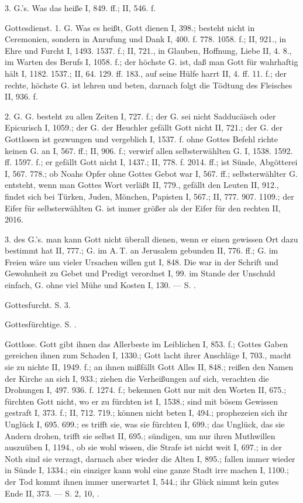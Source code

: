 3.  G.’s. Was das heiße I, 849. ff.; II, 546. f.

Gottesdienst. 1.  G. Was es heißt, Gott dienen I, 398.; besteht nicht in Ceremonien, sondern in Anrufung und Dank I, 400. f. 778. 1058. f.; II, 921., in Ehre und Furcht I, 1493. 1537. f.; II, 721., in Glauben, Hoffnung, Liebe II, 4. 8., im Warten des Berufs I, 1058. f.; der höchste G. ist, daß man Gott für wahrhaftig hält I, 1182. 1537.; II, 64. 129. ff. 183., auf seine Hülfe harrt II, 4. ff. 11. f.; der rechte, höchste G. ist lehren und beten, darnach folgt die Tödtung des Fleisches II, 936. f.

2.  G.  G. besteht zu allen Zeiten I, 727. f.; der G. sei nicht Sadducäisch oder Epicurisch I, 1059.; der G. der Heuchler gefällt Gott nicht II, 721.; der G. der Gottlosen ist gezwungen und vergeblich I, 1537. f.  ohne Gottes Befehl richte keinen G. an I, 567. ff.; II, 906. f.; verwirf allen selbsterwählten G. I, 1538. 1592. ff. 1597. f.; er gefällt Gott nicht I, 1437.; II, 778. f. 2014. ff.; ist Sünde, Abgötterei I, 567. 778.; ob Noahs Opfer ohne Gottes Gebot war I, 567. ff.; selbsterwählter G. entsteht, wenn man Gottes Wort verläßt II, 779., gefällt den Leuten II, 912., findet sich bei Türken, Juden, Mönchen, Papisten I, 567.; II, 777. 907. 1109.; der Eifer für selbsterwählten G. ist immer größer als der Eifer für den rechten II, 2016.

3.  des G.’s.  man kann Gott nicht überall dienen, wenn er einen gewissen Ort dazu bestimmt hat II, 777.; G. im A.\,T. an Jerusalem gebunden II, 776. ff.; G. im Freien wäre um vieler Ursachen willen gut I, 848. Die  war in der Schrift und Gewohnheit zu Gebet und Predigt verordnet I, 99.  im Stande der Unschuld einfach, G. ohne viel Mühe und Kosten I, 130. — S. .

Gottesfurcht. S.  3.

Gottesfürchtige. S. .

Gottlose. Gott gibt ihnen das Allerbeste im Leiblichen I, 853. f.; Gottes Gaben gereichen ihnen zum Schaden I, 1330.; Gott lacht ihrer Anschläge I, 703., macht sie zu nichte II, 1949. f.; an ihnen mißfällt Gott Alles II, 848.; reißen den Namen der Kirche an sich I, 933.; ziehen die Verheißungen auf sich, verachten die Drohungen I, 497. 936. f. 1274. f.; bekennen Gott nur mit den Worten II, 675.; fürchten Gott nicht, wo er zu fürchten ist I, 1538.; sind mit bösem Gewissen gestraft I, 373. f.; II, 712. 719.; können nicht beten I, 494.; prophezeien sich ihr Unglück I, 695. 699.; es trifft sie, was sie fürchten I, 699.; das Unglück, das sie Andern drohen, trifft sie selbst II, 695.; sündigen, um nur ihren Muthwillen auszuüben I, 1194., ob sie wohl wissen, die Strafe ist nicht weit I, 697.; in der Noth sind sie verzagt, darnach aber wieder die Alten I, 895.; fallen immer wieder in Sünde I, 1334.; ein einziger kann wohl eine ganze Stadt irre machen I, 1100.; der Tod kommt ihnen immer unerwartet I, 544.; ihr Glück nimmt kein gutes Ende II, 373. — S.  2,  10, .

